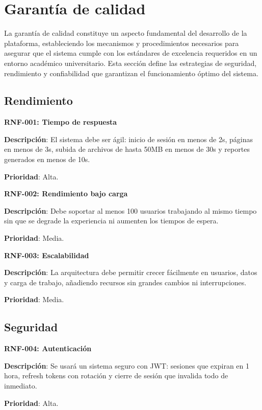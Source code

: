 \documentclass[12pt,a4paper,oneside]{report}
\begin{document}
\section{Garantía de calidad}\label{garantuxeda-de-calidad}

La garantía de calidad constituye un aspecto fundamental del desarrollo de la plataforma, estableciendo los mecanismos y procedimientos necesarios para asegurar que el sistema cumple con los estándares de excelencia requeridos en un entorno académico universitario. Esta sección define las estrategias de seguridad, rendimiento y confiabilidad que garantizan el funcionamiento óptimo del sistema.

\subsection{Rendimiento}\label{rendimiento}

\textbf{RNF-001: Tiempo de respuesta}

\textbf{Descripción}: El sistema debe ser ágil: inicio de sesión en menos de 2s, páginas en menos de 3s, subida de archivos de hasta 50MB en menos de 30s y reportes generados en menos de 10s.

\textbf{Prioridad}: Alta.

\textbf{RNF-002: Rendimiento bajo carga}

\textbf{Descripción}: Debe soportar al menos 100 usuarios trabajando al mismo tiempo sin que se degrade la experiencia ni aumenten los tiempos de espera.

\textbf{Prioridad}: Media.

\textbf{RNF-003: Escalabilidad}

\textbf{Descripción}: La arquitectura debe permitir crecer fácilmente en usuarios, datos y carga de trabajo, añadiendo recursos sin grandes cambios ni interrupciones.

\textbf{Prioridad}: Media.

\subsection{Seguridad}\label{seguridad}

\textbf{RNF-004: Autenticación}

\textbf{Descripción}: Se usará un sistema seguro con JWT: sesiones que expiran en 1 hora, refresh tokens con rotación y cierre de sesión que invalida todo de inmediato.

\textbf{Prioridad}: Alta.
\end{document}
